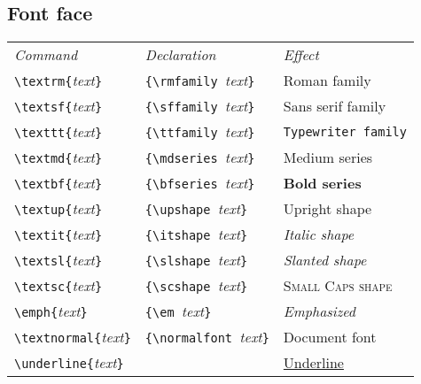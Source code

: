 \subsection{Font face}
\newcommand{\FontCmd}[3]{\PBS\verb!\#1{!\textit{text}\verb!}!  \> %
                         \verb!{\#2 !\textit{text}\verb!}! \> %
                         \#1{#3}}
\begin{tabular}{@{}l@{}l@{}l@{}}
\textit{Command} & \textit{Declaration} & \textit{Effect} \\
\verb!\textrm{!\textit{text}\verb!}!                    & %
        \verb!{\rmfamily !\textit{text}\verb!}!               & %
        \textrm{Roman family} \\
\verb!\textsf{!\textit{text}\verb!}!                    & %
        \verb!{\sffamily !\textit{text}\verb!}!               & %
        \textsf{Sans serif family} \\
\verb!\texttt{!\textit{text}\verb!}!                    & %
        \verb!{\ttfamily !\textit{text}\verb!}!               & %
        \texttt{Typewriter family} \\
\verb!\textmd{!\textit{text}\verb!}!                    & %
        \verb!{\mdseries !\textit{text}\verb!}!               & %
        \textmd{Medium series} \\
\verb!\textbf{!\textit{text}\verb!}!                    & %
        \verb!{\bfseries !\textit{text}\verb!}!               & %
        \textbf{Bold series} \\
\verb!\textup{!\textit{text}\verb!}!                    & %
        \verb!{\upshape !\textit{text}\verb!}!               & %
        \textup{Upright shape} \\
\verb!\textit{!\textit{text}\verb!}!                    & %
        \verb!{\itshape !\textit{text}\verb!}!               & %
        \textit{Italic shape} \\
\verb!\textsl{!\textit{text}\verb!}!                    & %
        \verb!{\slshape !\textit{text}\verb!}!               & %
        \textsl{Slanted shape} \\
\verb!\textsc{!\textit{text}\verb!}!                    & %
        \verb!{\scshape !\textit{text}\verb!}!               & %
        \textsc{Small Caps shape} \\
\verb!\emph{!\textit{text}\verb!}!                      & %
        \verb!{\em !\textit{text}\verb!}!               & %
        \emph{Emphasized} \\
\verb!\textnormal{!\textit{text}\verb!}!                & %
        \verb!{\normalfont !\textit{text}\verb!}!       & %
        \textnormal{Document font} \\
\verb!\underline{!\textit{text}\verb!}!                 & %
                                                        & %
        \underline{Underline}
\end{tabular}

